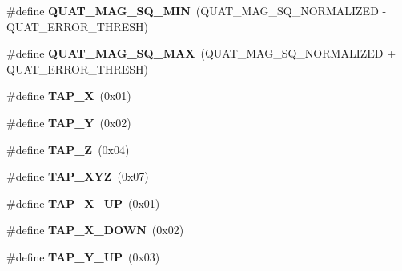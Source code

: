 \begin{DoxyCompactItemize}
\item 
\#define {\bfseries Q\+U\+A\+T\+\_\+\+M\+A\+G\+\_\+\+S\+Q\+\_\+\+M\+IN}~(Q\+U\+A\+T\+\_\+\+M\+A\+G\+\_\+\+S\+Q\+\_\+\+N\+O\+R\+M\+A\+L\+I\+Z\+ED -\/ Q\+U\+A\+T\+\_\+\+E\+R\+R\+O\+R\+\_\+\+T\+H\+R\+E\+SH)\hypertarget{group___d_r_i_v_e_r_s_gae76871da254b93d8b944ec65792db252}{}\label{group___d_r_i_v_e_r_s_gae76871da254b93d8b944ec65792db252}

\item 
\#define {\bfseries Q\+U\+A\+T\+\_\+\+M\+A\+G\+\_\+\+S\+Q\+\_\+\+M\+AX}~(Q\+U\+A\+T\+\_\+\+M\+A\+G\+\_\+\+S\+Q\+\_\+\+N\+O\+R\+M\+A\+L\+I\+Z\+ED + Q\+U\+A\+T\+\_\+\+E\+R\+R\+O\+R\+\_\+\+T\+H\+R\+E\+SH)\hypertarget{group___d_r_i_v_e_r_s_ga3036f612f259f4e13c631a31fb0e7176}{}\label{group___d_r_i_v_e_r_s_ga3036f612f259f4e13c631a31fb0e7176}

\item 
\#define {\bfseries T\+A\+P\+\_\+X}~(0x01)\hypertarget{group___d_r_i_v_e_r_s_ga22a5ea75ee18a788b441f66fffe83586}{}\label{group___d_r_i_v_e_r_s_ga22a5ea75ee18a788b441f66fffe83586}

\item 
\#define {\bfseries T\+A\+P\+\_\+Y}~(0x02)\hypertarget{group___d_r_i_v_e_r_s_ga762f9521bf33c9ba7a77595268b108ec}{}\label{group___d_r_i_v_e_r_s_ga762f9521bf33c9ba7a77595268b108ec}

\item 
\#define {\bfseries T\+A\+P\+\_\+Z}~(0x04)\hypertarget{group___d_r_i_v_e_r_s_gac2949c36d5f4eeb4769fdcf2d99284fd}{}\label{group___d_r_i_v_e_r_s_gac2949c36d5f4eeb4769fdcf2d99284fd}

\item 
\#define {\bfseries T\+A\+P\+\_\+\+X\+YZ}~(0x07)\hypertarget{group___d_r_i_v_e_r_s_gaa2b8e1661eb53aeac3ff4877ff2b79d9}{}\label{group___d_r_i_v_e_r_s_gaa2b8e1661eb53aeac3ff4877ff2b79d9}

\item 
\#define {\bfseries T\+A\+P\+\_\+\+X\+\_\+\+UP}~(0x01)\hypertarget{group___d_r_i_v_e_r_s_gaa979b4cd872ade6f4904199e83e9f3f4}{}\label{group___d_r_i_v_e_r_s_gaa979b4cd872ade6f4904199e83e9f3f4}

\item 
\#define {\bfseries T\+A\+P\+\_\+\+X\+\_\+\+D\+O\+WN}~(0x02)\hypertarget{group___d_r_i_v_e_r_s_gad3263c4a492cc11a014800d4a6e3311a}{}\label{group___d_r_i_v_e_r_s_gad3263c4a492cc11a014800d4a6e3311a}

\item 
\#define {\bfseries T\+A\+P\+\_\+\+Y\+\_\+\+UP}~(0x03)\hypertarget{group___d_r_i_v_e_r_s_ga70ea99c21d573b870b91909faf677107}{}\label{group___d_r_i_v_e_r_s_ga70ea99c21d573b870b91909faf677107}


\end{DoxyCompactItemize}
